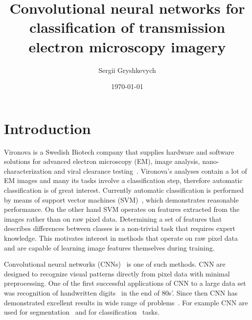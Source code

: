 \documentclass[a4paper, 11pt, table]{article}
\title{Convolutional neural networks for classification of transmission electron microscopy imagery}
\author{Sergii Gryshkevych}
\date{\today}
\begin{document}


\newpage\phantom{}

\newpage\phantom{}
\newpage\phantom{}


\tableofcontents

\section{Introduction}
Vironova is a Swedish Biotech company that supplies hardware and software solutions for advanced electron microscopy (EM), image analysis, nano-characterization and viral clearance testing~\cite{virnonva_linkedin}. Vironova's analyses contain a lot of EM images and many its tasks involve a classification step, therefore automatic classification is of great interest. Currently automatic classification is performed by means of support vector machines (SVM)~\cite{Boser:1992:TAO:130385.130401}, which demonstrates reasonable performance. On the other hand SVM operates on features extracted from the images rather than on raw pixel data. Determining a set of features that describes differences between classes is a non-trivial task that requires expert knowledge. This motivates interest in methods that operate on raw pixel data and are capable of learning image features themselves during training. 

Convolutional neural networks (CNNs)~\cite{LeCun1986} is one of such methods. CNN are designed to recognize visual patterns directly from pixel data with minimal preprocessing. One of the first successful applications of CNN to a large data set was recognition of handwritten digits~\cite{41400} in the end of 80s'. Since then CNN has demonstrated excellent results in wide range of problems~\cite{NIPS2012_4824, DBLP:journals/corr/LinCY13}. For example CNN are used for segmentation~\cite{DBLP:journals/corr/ShelhamerLD16, Ronneberger2015} and for classification~\cite{NIPS2012_4824, DBLP:journals/corr/abs-1202-2745} tasks.
\end{document}
